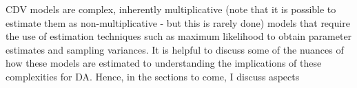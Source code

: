 \documentclass[ShortAfour,times,sageapa]{sagej}
\begin{document}
	
	CDV models are complex, inherently multiplicative (note that it is possible to estimate them as non-multiplicative - but this is rarely done) models that require the use of estimation techniques such as maximum likelihood to obtain parameter estimates and sampling variances.
	It is helpful to discuss some of the nuances of how these models are estimated to understanding the implications of these complexities for DA.
	Hence, in the sections to come, I discuss aspects 
%
%	
%	
%
%	
\end{document}
